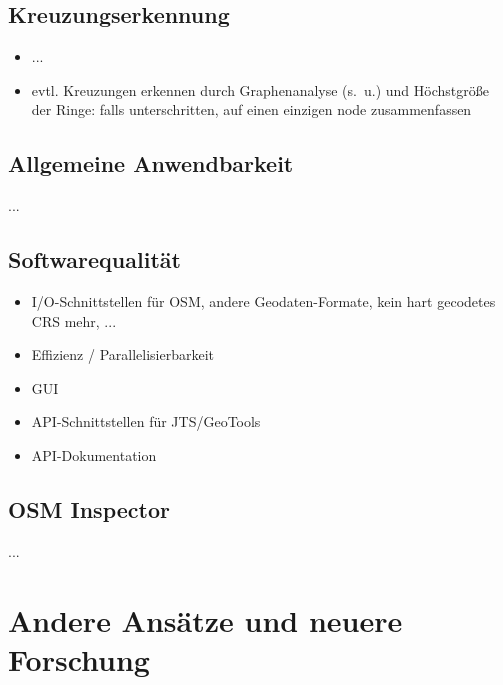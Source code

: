 \documentclass[../main/thesis.tex]{subfiles}
\begin{document}



\subsection{Kreuzungserkennung}
\begin{itemize}
\item ...
\item evtl. Kreuzungen erkennen durch Graphenanalyse (s.~u.) und Höchstgröße der Ringe: falls unterschritten, auf einen einzigen node zusammenfassen
\end{itemize}



\subsection{Allgemeine Anwendbarkeit}
...



\subsection{Softwarequalität}

\begin{itemize}
\item I/O-Schnittstellen für OSM, andere Geodaten-Formate, kein hart gecodetes CRS mehr, ...
\item Effizienz / Parallelisierbarkeit
\item GUI
\item API-Schnittstellen für JTS/GeoTools
\item API-Dokumentation
\end{itemize}



\subsection{OSM Inspector}

...



\section{Andere Ansätze und neuere Forschung}
\end{document}
